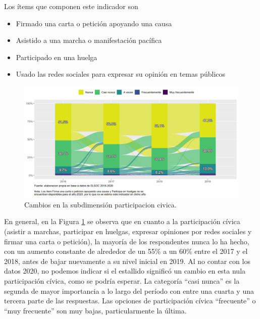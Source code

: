 \documentclass[
  12pt,
]{book}
\begin{document}
Los ítems que componen este indicador son

\begin{itemize}
\item
  Firmado una carta o petición apoyando una causa
\item
  Asistido a una marcha o manifestación pacífica
\item
  Participado en una huelga
\item
  Usado las redes sociales para expresar su opinión en temas públicos
\end{itemize}

\begin{figure}[H]

{\centering \includegraphics[width=1\linewidth,height=1\textheight]{output/graphs/alluvial_participacion} 

}

\caption{Cambios en la subdimensión participacion civica.}\label{fig:alluvial-participacion}
\end{figure}

En general, en la Figura \ref{fig:alluvial-participacion} se observa que en cuanto a la participación cívica (asistir a marchas, participar en huelgas, expresar opiniones por redes sociales y firmar una carta o petición), la mayoría de los respondentes nunca lo ha hecho, con un aumento constante de alrededor de un 55\% a un 60\% entre el 2017 y el 2018, antes de bajar nuevamente a su nivel inicial en 2019. Al no contar con los datos 2020, no podemos indicar si el estallido significó un cambio en esta nula participación cívica, como se podría esperar. La categoría ``casi nunca'' es la segunda de mayor importancia a lo largo del período con entre una cuarta y una tercera parte de las respuestas. Las opciones de participación cívica ``frecuente'' o ``muy frecuente'' son muy bajas, particularmente la última.
\end{document}
